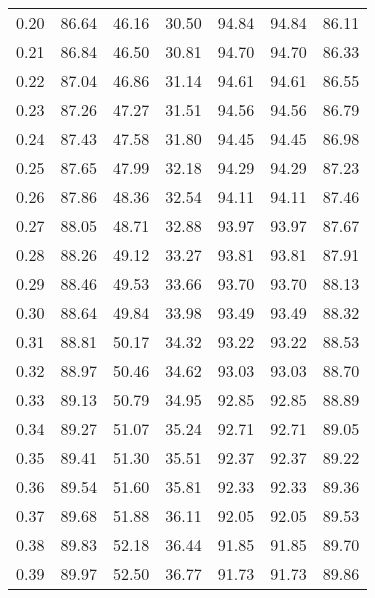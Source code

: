 \begin{tabular}{|c|c|c|c|c|c|c|}
      0.20 &     86.64 &     46.16 &      30.50 &   94.84 &      94.84 &         86.11 \\
      0.21 &     86.84 &     46.50 &      30.81 &   94.70 &      94.70 &         86.33 \\
      0.22 &     87.04 &     46.86 &      31.14 &   94.61 &      94.61 &         86.55 \\
      0.23 &     87.26 &     47.27 &      31.51 &   94.56 &      94.56 &         86.79 \\
      0.24 &     87.43 &     47.58 &      31.80 &   94.45 &      94.45 &         86.98 \\
      0.25 &     87.65 &     47.99 &      32.18 &   94.29 &      94.29 &         87.23 \\
      0.26 &     87.86 &     48.36 &      32.54 &   94.11 &      94.11 &         87.46 \\
      0.27 &     88.05 &     48.71 &      32.88 &   93.97 &      93.97 &         87.67 \\
      0.28 &     88.26 &     49.12 &      33.27 &   93.81 &      93.81 &         87.91 \\
      0.29 &     88.46 &     49.53 &      33.66 &   93.70 &      93.70 &         88.13 \\
      0.30 &     88.64 &     49.84 &      33.98 &   93.49 &      93.49 &         88.32 \\
      0.31 &     88.81 &     50.17 &      34.32 &   93.22 &      93.22 &         88.53 \\
      0.32 &     88.97 &     50.46 &      34.62 &   93.03 &      93.03 &         88.70 \\
      0.33 &     89.13 &     50.79 &      34.95 &   92.85 &      92.85 &         88.89 \\
      0.34 &     89.27 &     51.07 &      35.24 &   92.71 &      92.71 &         89.05 \\
      0.35 &     89.41 &     51.30 &      35.51 &   92.37 &      92.37 &         89.22 \\
      0.36 &     89.54 &     51.60 &      35.81 &   92.33 &      92.33 &         89.36 \\
      0.37 &     89.68 &     51.88 &      36.11 &   92.05 &      92.05 &         89.53 \\
      0.38 &     89.83 &     52.18 &      36.44 &   91.85 &      91.85 &         89.70 \\
      0.39 &     89.97 &     52.50 &      36.77 &   91.73 &      91.73 &         89.86 \\

\end{tabular}
